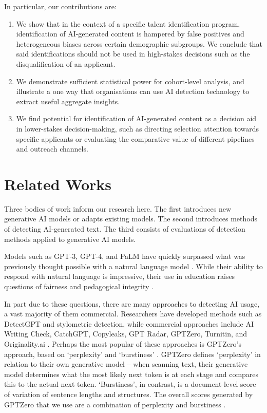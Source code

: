 In particular, our contributions are:

\begin{enumerate}
  \item We show that in the context of a specific talent identification program, identification of AI-generated content is hampered by false positives and heterogeneous biases across certain demographic subgroups. We conclude that said identifications should not be used in high-stakes decisions such as the disqualification of an applicant.
  \item We demonstrate sufficient statistical power for cohort-level analysis, and illustrate a one way that organisations can use AI detection technology to extract useful aggregate insights.
  \item We find potential for identification of AI-generated content as a decision aid in lower-stakes decision-making, such as directing selection attention towards specific applicants or evaluating the comparative value of different pipelines and outreach channels.
\end{enumerate}

\section{Related Works}\label{sec:rw}
Three bodies of work inform our research here. The first introduces new generative AI models or adapts existing models. The second introduces methods of detecting AI-generated text. The third consists of evaluations of detection methods applied to generative AI models.

Models such as GPT-3, GPT-4, and PaLM have quickly surpassed what was previously thought possible with a natural language model \cite{brown_language_2020,chowdhery_palm_2022,openai_gpt-4_2023}. While their ability to respond with natural language is impressive, their use in education raises questions of fairness and pedagogical integrity \cite{hu_challenges_2023}. 

In part due to these questions, there are many approaches to detecting AI usage, a vast majority of them commercial. Researchers have developed methods such as DetectGPT and stylometric detection, while commercial approaches include AI Writing Check, CatchGPT, Copyleaks, GPT Radar, GPTZero,  Turnitin, and Originality.ai \cite{mitchell_detectgpt_2023,kalpesh_krishna_paraphrasing_2023,tharindu_kumarage_stylometric_2023,gptzero_gptzero_2023,kirchner_new_2023}. Perhaps the most popular of these approaches is GPTZero's approach, based on `perplexity' and `burstiness' \cite{liang_gpt_2023,kalpesh_krishna_paraphrasing_2023}. GPTZero defines `perplexity' in relation to their own generative model – when scanning text, their generative model determines what the most likely next token is at each stage and compares this to the actual next token. `Burstiness', in contrast, is a document-level score of variation of sentence lengths and structures. The overall scores generated by GPTZero that we use are a combination of perplexity and burstiness \cite{gptzero_gptzero_2023}.

